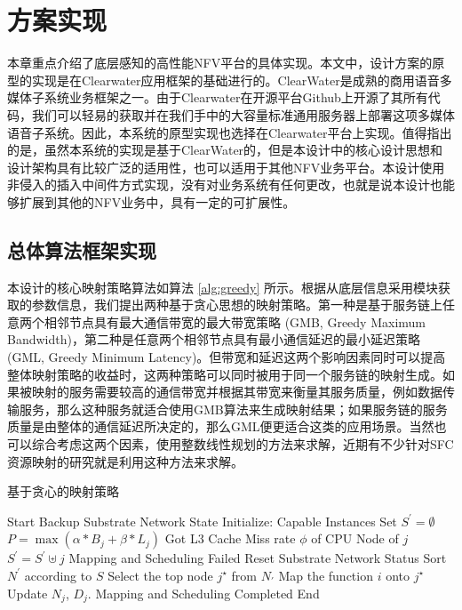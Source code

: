 \chapter{方案实现}
\label{chapter:implement}
本章重点介绍了底层感知的高性能NFV平台的具体实现。本文中，设计方案的原型的实现是在Clearwater应用框架的基础进行的。ClearWater是成熟的商用语音多媒体子系统业务框架之一。由于Clearwater在开源平台Github上开源了其所有代码，我们可以轻易的获取并在我们手中的大容量标准通用服务器上部署这项多媒体语音子系统。因此，本系统的原型实现也选择在Clearwater平台上实现。值得指出的是，虽然本系统的实现是基于ClearWater的，但是本设计中的核心设计思想和设计架构具有比较广泛的适用性，也可以适用于其他NFV业务平台。本设计使用非侵入的插入中间件方式实现，没有对业务系统有任何更改，也就是说本设计也能够扩展到其他的NFV业务中，具有一定的可扩展性。
\section{总体算法框架实现}
本设计的核心映射策略算法如算法 \ref{alg:greedy} 所示。根据从底层信息采用模块获取的参数信息，我们提出两种基于贪心思想的映射策略。第一种是基于服务链上任意两个相邻节点具有最大通信带宽的最大带宽策略 (GMB, Greedy Maximum Bandwidth)，第二种是任意两个相邻节点具有最小通信延迟的最小延迟策略 (GML, Greedy Minimum Latency)。但带宽和延迟这两个影响因素同时可以提高整体映射策略的收益时，这两种策略可以同时被用于同一个服务链的映射生成。如果被映射的服务需要较高的通信带宽并根据其带宽来衡量其服务质量，例如数据传输服务，那么这种服务就适合使用GMB算法来生成映射结果；如果服务链的服务质量是由整体的通信延迟所决定的，那么GML便更适合这类的应用场景。当然也可以综合考虑这两个因素，使用整数线性规划的方法来求解，近期有不少针对SFC资源映射的研究就是利用这种方法来求解。
\begin{algorithm} 
	\caption{基于贪心的映射策略}  
	\label{alg:greedy}  
	\begin{algorithmic} [1]
		\State Start
		\State Backup Substrate Network State
		\State Initialize: Capable Instances Set $S^{\prime} = \emptyset$
		\State	$P = \max(\alpha*B_{j} + \beta*L_{j})$
		\State Got L3 Cache Miss rate $\phi$ of CPU Node of $j$
		\State $S^{\prime} = S^{\prime}\uplus j $
		\EndIf			
		\EndFor					
		\State Mapping and Scheduling Failed
		\State Reset Substrate Network Status
		\Return
		\EndIf
		\State Sort $N^{\prime}$ according to $S$	
		\State Select the top node $j^{\star}$ from $N_{\prime}$
		\State Map the function $i$ onto  $j^{\star}$
		\State Update $N_{j}$, $D_{j}$.
		\EndFor
		\State Mapping and Scheduling Completed
		\State End
	\end{algorithmic}  
\end{algorithm} 
